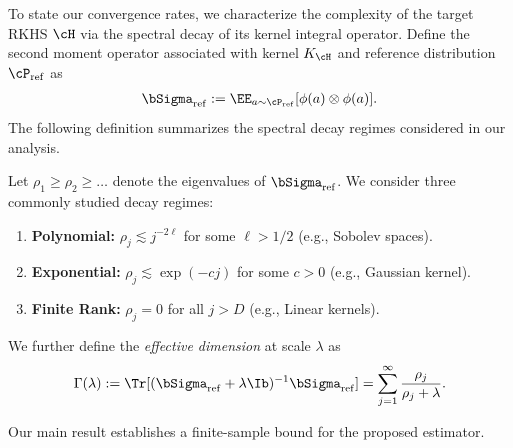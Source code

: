 \documentclass[english,11pt]{article}
\begin{document}
To state our convergence rates, we characterize the complexity of the target RKHS $\cH$ via the spectral decay of its kernel integral operator.
Define the second moment operator associated with kernel $K_{\cH}$ and reference distribution \(\cP_{\operatorname{ref}}\) as
\begin{align*}
    \bSigma_{\operatorname{ref}} := \EE_{a \sim \cP_{\operatorname{ref}}}[\phi(a)\otimes \phi(a)].
\end{align*}
The following definition summarizes the spectral decay regimes considered in our analysis.
\begin{definition}\label{def:spectral}
    Let $\rho_1 \ge \rho_2 \ge \dots$ denote the eigenvalues of $\bSigma_{\operatorname{ref}}$. We consider three commonly studied decay regimes:
    \begin{enumerate}[label=(\alph*), leftmargin=*]
        \item \textbf{Polynomial:} $\rho_j \lesssim j^{-2\ell}$ for some $\ell > 1/2$ (e.g., Sobolev spaces).
        \item \textbf{Exponential:} $\rho_j \lesssim \exp(-c j)$ for some $c > 0$ (e.g., Gaussian kernel).
        \item \textbf{Finite Rank:} $\rho_j = 0$ for all $j > D$ (e.g., Linear kernels).
    \end{enumerate}
    We further define the \emph{effective dimension} at scale $\lambda$ as
    \begin{align*}
        \Gamma(\lambda) := \Tr [ (\bSigma_{\operatorname{ref}} + \lambda \Ib)^{-1} \bSigma_{\operatorname{ref}} ]
    = \sum_{j=1}^\infty \frac{\rho_j}{\rho_j + \lambda}.
    \end{align*}
\end{definition}

Our main result establishes a finite-sample bound for the proposed estimator.
\end{document}
